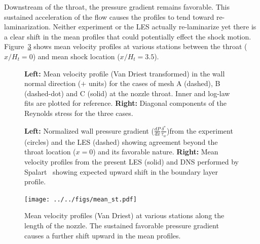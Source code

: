 \documentclass[]{aiaa-tc}%
\begin{document}




Downstream of the throat, the pressure gradient remains favorable.  This sustained acceleration of the flow causes the profiles to tend toward re-laminarization.  Neither experiment or the LES actually re-laminarize yet there is a clear shift in the mean profiles that could potentially effect the shock motion.  Figure~\ref{fig:stations} shows mean velocity profiles at various stations between the throat ($x/H_t=0$) and mean shock location ($x/H_t=3.5$).


\begin{figure}[!ht]
	\caption{ {\bf Left:} Mean velocity profile (Van Driest transformed) in the wall normal direction ($+$ units) for the cases of mesh A (dashed), B (dashed-dot) and C (solid) at the nozzle throat.  Inner and log-law fits are plotted for reference.  {\bf Right:} Diagonal components of the Reynolds stress for the three cases.
	\label{fig:BL_prof}
	}
\end{figure}


\begin{figure}[!ht]
	\caption{ {\bf Left:} Normalized wall pressure gradient ($\frac{dP}{dx} \frac{\delta^*}{\tau_w}$)from the experiment (circles) and the LES (dashed) showing agreement beyond the throat location ($x=0$) and its favorable nature.  {\bf Right:} Mean velocity profiles from the present LES (solid) and DNS performed by Spalart~\cite{Spalart:93} showing expected upward shift in the boundary layer profile.
 	\label{fig:dPdx}
	}
\end{figure}



\begin{figure}[!ht]
	\begin{centering}
	\texttt{[image: ../../figs/mean\_st.pdf]}

	\caption{ Mean velocity profiles (Van Driest) at various stations along the length of the nozzle.  The sustained favorable pressure gradient causes a further shift upward in the mean profiles.
 	\label{fig:stations}
	}
	\end{centering}
\end{figure}
\end{document}
